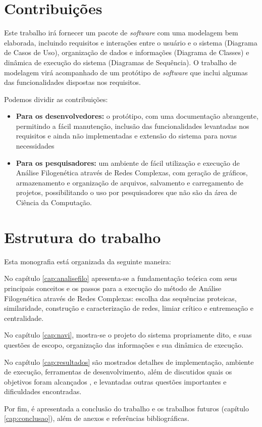 \section{Contribuições}

Este trabalho irá fornecer um pacote de \textit{software} com uma modelagem bem elaborada, incluindo requisitos e interações entre o usuário
e o sistema (Diagrama de Casos de Uso), organização de dados e informações (Diagrama de Classes) e dinâmica de execução do sistema (Diagramas de Sequência).
O trabalho de modelagem virá acompanhado de um protótipo de \textit{software} que inclui algumas das funcionalidades dispostas nos requisitos.

Podemos dividir as contribuições:

\begin{itemize}
  \item{\textbf{Para os desenvolvedores:} o protótipo, com uma documentação abrangente, permitindo a fácil
manutenção, inclusão das funcionalidades levantadas nos requisitos e ainda não implementadas e extensão do sistema para novas necessidades}
  \item{\textbf{Para os pesquisadores:} um ambiente de fácil utilização e execução de Análise Filogenética através de Redes Complexas, com
geração de gráficos, armazenamento e organização de arquivos, salvamento e carregamento de projetos, possibilitando o uso por pesquisadores
que não são da área de Ciência da Computação.}
\end{itemize}


\section{Estrutura do trabalho}

Esta monografia está organizada da seguinte maneira:

No capítulo \ref{cap:analisefilo} apresenta-se a fundamentação teórica com seus principais conceitos
e os passos para a execução do método de Análise Filogenética através de Redes Complexas: escolha das sequências proteicas,
similaridade, construção e caracterização de redes, limiar crítico e entremeação e centralidade.

No capítulo \ref{cap:navi}, mostra-se o projeto do sistema propriamente dito, e suas questões
de escopo, organização das informações e sua dinâmica de execução.

No capítulo \ref{cap:resultados} são mostrados detalhes de implementação, ambiente de execução, ferramentas de
desenvolvimento, além de discutidos quais os objetivos foram alcançados , e levantadas
outras questões importantes e dificuldades encontradas.

Por fim, é apresentada a conclusão do trabalho e os trabalhos futuros (capítulo \ref{cap:conclusao}), além de anexos e referências bibliográficas.





